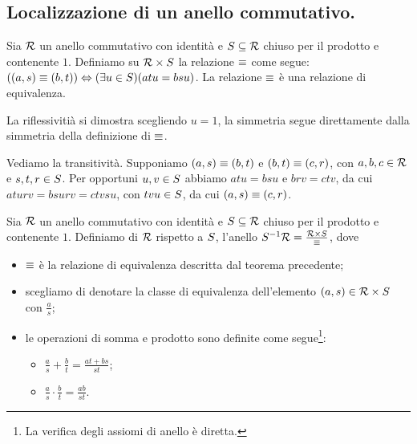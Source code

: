 \subsection{Localizzazione di un anello commutativo.}\label{Localizzazione}
\begin{Theorem}
	Sia $\mathcal{R}$ un anello commutativo con identit\`a e $S \subseteq \mathcal{R}$ chiuso per il prodotto e contenente $1$. Definiamo su $\mathcal{R} \times S$ la relazione $\equiv$ come segue: $((a,s) \equiv (b, t)) \Leftrightarrow (\exists u \in S)(atu = bsu)$. La relazione $\equiv$ \`e una relazione di equivalenza.
\end{Theorem}
\Proof La riflessiviti\`a si dimostra scegliendo $u = 1$, la simmetria segue direttamente dalla simmetria della definizione di $\equiv$.
\par Vediamo la transitivit\`a. Supponiamo $(a,s) \equiv (b,t)$ e $(b,t) \equiv (c,r)$, con $a,b,c \in \mathcal{R}$ e $s,t,r \in S$. Per opportuni $u, v \in S$ abbiamo $atu = bsu$ e $brv = ctv$, da cui $aturv = bsurv = ctvsu$, con $tvu \in S$, da cui $(a,s) \equiv (c,r)$. \EndProof
\begin{Definition}
	Sia $\mathcal{R}$ un anello commutativo con identit\`a e $S \subseteq \mathcal{R}$ chiuso per il prodotto e contenente $1$. Definiamo  di $\mathcal{R}$ rispetto a $S$, l'anello ${S}^{-1}\mathcal{R} = \frac{\mathcal{R} \times S}{\equiv}$, dove
	\begin{itemize}
		\item $\equiv$ \`e la relazione di equivalenza descritta dal teorema precedente;
		\item scegliamo di denotare la classe di equivalenza dell'elemento $(a,s) \in \mathcal{R} \times S$ con $\frac{a}{s}$;
		\item le operazioni di somma e prodotto sono definite come segue\footnote{La verifica degli assiomi di anello \`e diretta.}:
		\begin{itemize}
			\item $\frac{a}{s} + \frac{b}{t} = \frac{at + bs}{st}$;
			\item $\frac{a}{s} \cdot \frac{b}{t} = \frac{ab}{st}$.
		\end{itemize}
	\end{itemize}
\end{Definition}
